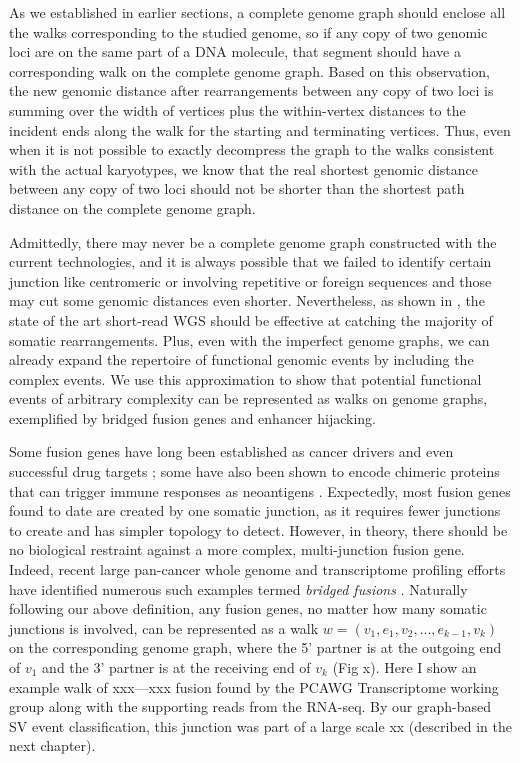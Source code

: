 \documentclass[phd,tocprelim]{cornell}
\begin{document}
As we established in earlier sections, a complete genome graph should enclose all the walks corresponding to the studied genome, so if any copy of two genomic loci are on the same part of a DNA molecule, that segment should have a corresponding walk on the complete genome graph. Based on this observation, the new genomic distance after rearrangements between any copy of two loci is summing over the width of vertices plus the within-vertex distances to the incident ends along the walk for the starting and terminating vertices. Thus, even when it is not possible to exactly decompress the graph to the walks consistent with the actual karyotypes, we know that the real shortest genomic distance between any copy of two loci should not be shorter than the shortest path distance on the complete genome graph.

Admittedly, there may never be a complete genome graph constructed with the current technologies, and it is always possible that we failed to identify certain junction like centromeric \cite{Cameron2021-db} or involving repetitive or foreign sequences \cite{Behr2021-gf} and those may cut some genomic distances even shorter. Nevertheless, as shown in \cite{Behr2021-gf}, the state of the art short-read WGS should be effective at catching the majority of somatic rearrangements. Plus, even with the imperfect genome graphs, we can already expand the repertoire of functional genomic events by including the complex events. We use this approximation to show that potential functional events of arbitrary complexity can be represented as walks on genome graphs, exemplified by bridged fusion genes and enhancer hijacking.

Some fusion genes have long been established as cancer drivers and even successful drug targets \cite{Gao2018-nm}; some have also been shown to encode chimeric proteins that can trigger immune responses as neoantigens \cite{Rathe2019-cr}. Expectedly, most fusion genes found to date are created by one somatic junction, as it requires fewer junctions to create and has simpler topology to detect. However, in theory, there should be no biological restraint against a more complex, multi-junction fusion gene. Indeed, recent large pan-cancer whole genome and transcriptome profiling efforts have identified numerous such examples termed \textit{bridged fusions} \cite{PCAWG_Transcriptome_Core_Group2020-zp,Yun2020-bi}. Naturally following our above definition, any fusion genes, no matter how many somatic junctions is involved, can be represented as a walk $w = (v_1, e_1, v_2, ..., e_{k-1}, v_k)$ on the corresponding genome graph, where the 5’ partner is at the outgoing end of $v_1$ and the 3’ partner is at the receiving end of $v_k$ (Fig x). Here I show an example walk of xxx—xxx fusion found by the PCAWG Transcriptome working group \cite{PCAWG_Transcriptome_Core_Group2020-zp} along with the supporting reads from the RNA-seq. By our graph-based SV event classification, this junction was part of a large scale xx (described in the next chapter).
\end{document}
